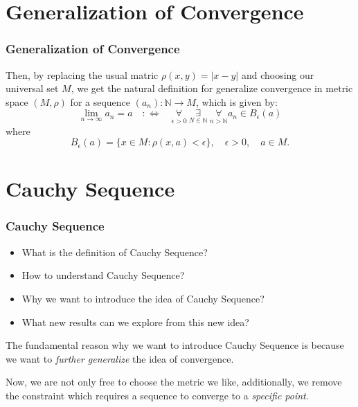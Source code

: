 \documentclass[12pt, t]{beamer}
\renewcommand{\emph}[1]{{\color{Turquoise3}\textsl{#1}}}
\begin{document}
\section{Generalization of Convergence}
\begin{frame}
    \frametitle{Generalization of Convergence}
    Then, by replacing the usual matric $\rho(x,y)=|x-y|$ and choosing our universal set $M$, we get the natural definition for
    generalize convergence in metric space $(M,\rho)$ for a sequence $(a_n):\mathbb{N}\rightarrow M$, which is given by:
    \begin{equation*}
        \lim_{n\rightarrow \infty}a_n=a\quad :\Leftrightarrow \quad \underset{\epsilon>0}{\forall}\ \underset{N\in \mathbb{N}}{\exists}\ \underset{n>\mathbb{N}}{\forall} a_n\in B_\epsilon(a)
    \end{equation*}
    where
    \begin{equation*}
        B_\epsilon(a)=\{ x\in M:\rho(x,a)<\epsilon\},\quad \epsilon>0,\quad a\in M.
    \end{equation*}

\end{frame}

\section{Cauchy Sequence}
\begin{frame}
    \frametitle{Cauchy Sequence}
    \begin{itemize}
        \item What is the definition of Cauchy Sequence?
        \item How to understand Cauchy Sequence?
        \item Why we want to introduce the idea of Cauchy Sequence?
        \item What new results can we explore from this new idea?
    \end{itemize}

    \vspace{1em}

    The fundamental reason why we want to introduce Cauchy Sequence is because we want to \emph{further generalize} the idea of
    convergence.\\

    \vspace{1em}

    Now, we are not only free to choose the metric we like, additionally, we remove the constraint which requires a sequence to converge to a \emph{specific point}.
\end{frame}
\end{document}
